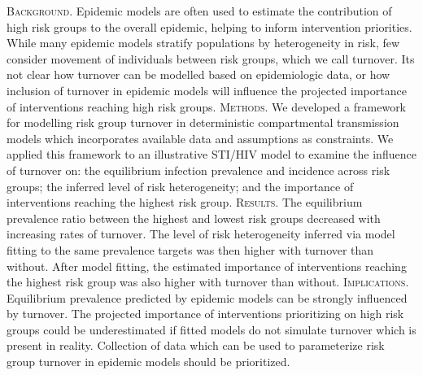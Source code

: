 \textsc{Background.}
Epidemic models are often used to estimate
the contribution of high risk groups to the overall epidemic,
helping to inform intervention priorities.
While many epidemic models stratify populations by heterogeneity in risk,
few consider movement of individuals between risk groups,
which we call turnover.
Its not clear
how turnover can be modelled based on epidemiologic data, or %
how inclusion of turnover in epidemic models will influence
the projected importance of interventions reaching high risk groups.
\textsc{Methods.}
We developed a framework for modelling risk group turnover
in deterministic compartmental transmission models
which incorporates available data and assumptions as constraints.
We applied this framework to an illustrative STI/HIV model
to examine the influence of turnover on:
the equilibrium infection prevalence and incidence across risk groups; %
the inferred level of risk heterogeneity; and %
the importance of interventions reaching the highest risk group.
\textsc{Results.}
The equilibrium prevalence ratio
between the highest and lowest risk groups
decreased with increasing rates of turnover. %
The level of risk heterogeneity inferred
via model fitting to the same prevalence targets
was then higher with turnover than without. %
After model fitting,
the estimated importance of interventions reaching the highest risk group
was also higher with turnover than without.
\textsc{Implications.}
Equilibrium prevalence predicted by epidemic models
can be strongly influenced by turnover.
The projected importance of interventions prioritizing on high risk groups
could be underestimated if fitted models do not simulate turnover
which is present in reality.
Collection of data which can be used to
parameterize risk group turnover in epidemic models should be prioritized. %
\\